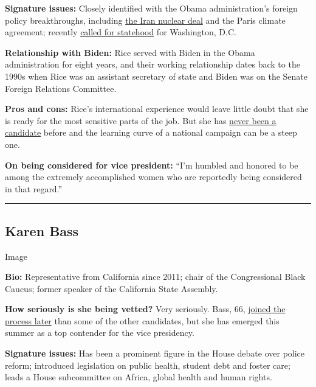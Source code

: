 \textbf{Signature issues:} Closely identified with the Obama
administration's foreign policy breakthroughs, including
\href{https://www.nytimes3xbfgragh.onion/2018/05/08/opinion/trump-iran-deal-foolish.html}{the
Iran nuclear deal} and the Paris climate agreement; recently
\href{https://www.nytimes3xbfgragh.onion/2020/06/09/opinion/trump-military-washington-statehood.html}{called
for statehood} for Washington, D.C.

\textbf{Relationship with Biden:} Rice served with Biden in the Obama
administration for eight years, and their working relationship dates
back to the 1990s when Rice was an assistant secretary of state and
Biden was on the Senate Foreign Relations Committee.

\textbf{Pros and cons:} Rice's international experience would leave
little doubt that she is ready for the most sensitive parts of the job.
But she has
\href{https://www.nytimes3xbfgragh.onion/2020/07/27/us/politics/susan-rice-biden-vice-president.html}{never
been a candidate} before and the learning curve of a national campaign
can be a steep one.

\textbf{On being considered for vice president:} ``I'm humbled and
honored to be among the extremely accomplished women who are reportedly
being considered in that regard.''

\begin{center}\rule{0.5\linewidth}{\linethickness}\end{center}

\hypertarget{karen-bass}{%
\subsection{Karen Bass}\label{karen-bass}}

Image

\textbf{Bio:} Representative from California since 2011; chair of the
Congressional Black Caucus; former speaker of the California State
Assembly.

\textbf{How seriously is she being vetted?} Very seriously. Bass, 66,
\href{https://www.nytimes3xbfgragh.onion/2020/06/23/us/politics/karen-bass-joe-biden-vp.html}{joined
the process later} than some of the other candidates, but she has
emerged this summer as a top contender for the vice presidency.

\textbf{Signature issues:} Has been a prominent figure in the House
debate over police reform; introduced legislation on public health,
student debt and foster care; leads a House subcommittee on Africa,
global health and human rights.


